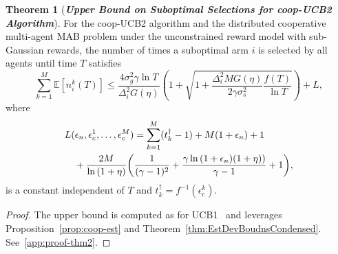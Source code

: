 \documentclass[final,5p,times,twocolumn]{elsarticle}
\theoremstyle{definition}
\newtheorem{theorem}{Theorem}
\newtheorem{remark}{Remark}
\newcommand{\lnn}[1]{%
	\ln  \left(#1\right)%
}
\newcommand\bit[1]{\textit{\textbf{#1}}}
\begin{document}
\begin{theorem}[\bit{Upper Bound on Suboptimal Selections for coop-UCB2 Algorithm}]\label{thm:regret-coop-ucb2}
For the coop-UCB2 algorithm and the distributed cooperative multi-agent MAB problem under the unconstrained reward model with sub-Gaussian rewards, the number of times a suboptimal arm $i$ is selected by all agents until time $T$ satisfies
\[
	\sum_{k=1}^M\mathbb{E}[n_i^{k}(T)]  \leq \frac{4 \sigma_g^2 \gamma \ln T}{\Delta_i^2 G(\eta)} \left( 1 + \sqrt{1 + \frac{\Delta_i^2 M G(\eta)}{2\gamma \sigma_s^2} \frac{f(T)}{\ln T}} \right) +L, 
\]
where 
\begin{align}
& L(\epsilon_n, \epsilon_c^1, \ldots, \epsilon_c^M) =  \sum_{k=1}^M  (t_k^\dagger -1) + M(1+\epsilon_n) +1  \nonumber \\
& \quad + \frac{2M}{\lnn{1 +\eta}}  \bigg( \frac{1}{(\gamma - 1)^2}  + {\frac{\gamma \lnn{1 + \epsilon_n)(1 + \eta)}}{\gamma - 1} +1}\bigg),
\label{eq:L}
\end{align}
is a constant independent of $T$ and $t^\dagger_k= f^{-1}(\epsilon_c^k)$. 
\end{theorem}

\begin{proof}
The upper bound is computed %
as for UCB1~\cite{PA-NCB-PF:02} and leverages Proposition~\ref{prop:coop-est} and Theorem~\ref{thm:EstDevBoudnsCondensed}.  %
See~\ref{app:proof-thm2}.  
\end{proof}
	
	
	
\end{document}
